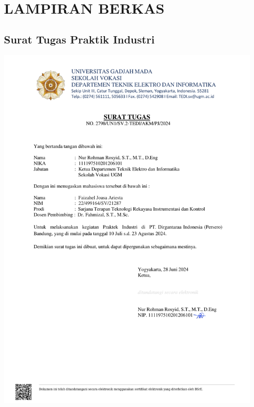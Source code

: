 \appendix
\chapter*{LAMPIRAN BERKAS}
\setcounter{section}{0} %
\setcounter{page}{1}

\renewcommand{\thesection}{\Alph{section}}
\renewcommand{\thesubsection}{\Alph{section}.\arabic{subsection}\hspace{-0.25cm}}
\renewcommand{\thepage}{L - \arabic{page}}


%
%
%
%
%


\section{Surat Tugas Praktik Industri}
\includegraphics[scale=0.7]{dokumen/suratTugas.pdf}

